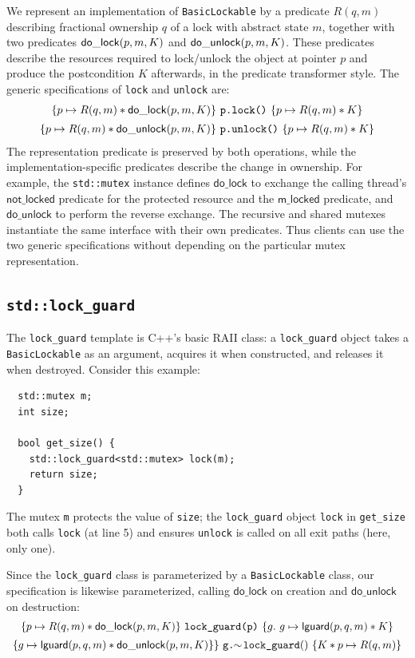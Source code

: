 \documentclass[acmsmall,screen,review,anonymous]{acmart}
\begin{document}
We represent an implementation of \lstinline{BasicLockable} by a predicate
$R(q,m)$ describing fractional ownership $q$ of a lock with abstract state
$m$, together with two predicates $\mathsf{do\_lock}(p, m, K)$ and $\mathsf{do\_unlock}(p, m, K)$.
These predicates
describe the resources required to lock/unlock the object at pointer $p$ and produce
the postcondition $K$ afterwards, in the predicate transformer style.  The generic specifications of \lstinline{lock} and \lstinline{unlock} are:
\[\begin{array}{c}    \{p\mapsto R(q,m)\ast \dolock{p}{m}{K}\}\ \texttt{p.lock()}\ \{p\mapsto R(q,m)\ast K\}\vspace{.5em}\\
\{p\mapsto R(q,m)\ast \dounlock{p}{m}{K}\}\ \texttt{p.unlock()}\ \{p\mapsto R(q,m)\ast K\}
\end{array}\]
The representation predicate is preserved by both operations, while the
implementation-specific predicates describe the change in ownership.
For example, the \lstinline{std::mutex} instance defines $\mathsf{do\_lock}$ to exchange the
calling thread's $\mathsf{not\_locked}$ predicate for the protected resource and the $\mathsf{m\_locked}$ predicate, and $\mathsf{do\_unlock}$ to perform the reverse exchange.  The
recursive and shared mutexes instantiate the same interface with their own
predicates. Thus clients can use the two generic specifications without
depending on the particular mutex representation.

\subsection{\lstinline{std::lock_guard}}
The \lstinline{lock_guard} template is C++'s basic RAII class: a
\lstinline{lock_guard} object takes a
\lstinline{BasicLockable}
as an argument, acquires it when constructed,
and releases it when destroyed.
Consider this example:
\begin{lstlisting}
  std::mutex m;
  int size;

  bool get_size() {
    std::lock_guard<std::mutex> lock(m);
    return size;
  }
\end{lstlisting}
The mutex \lstinline{m} protects the value of \lstinline{size}; the
\lstinline{lock_guard} object \lstinline{lock} in \lstinline{get_size} both calls
\lstinline{lock} (at line 5) and ensures \lstinline{unlock} is called on all
exit paths (here, only one).

Since the \lstinline{lock_guard} class is parameterized by a \lstinline{BasicLockable} class, our specification is likewise parameterized, calling $\mathsf{do\_lock}$ on creation and $\mathsf{do\_unlock}$ on destruction:
\[\begin{array}{c}
\{p \mapsto R(q, m) \ast \dolock{p}{m}{K}\}\ \texttt{lock\_guard(p)}\ \{g.\ g \mapsto \lguard(p, q, m) \ast K\} \vspace{.5em}\\
\{g \mapsto \lguard(p, q, m) \ast \dounlock{p}{m}{K}\}\}\ \texttt{g.}\!\!\sim\!\texttt{lock\_guard}()\ \{K \ast p \mapsto R(q, m)\}
\end{array}\]
\end{document}
